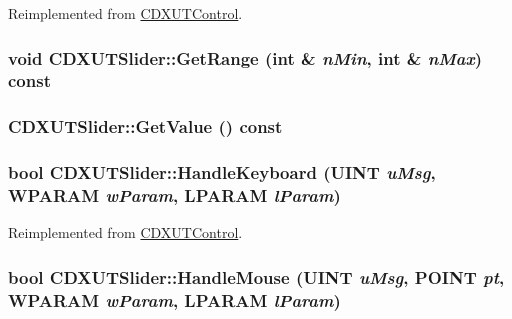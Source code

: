 Reimplemented from \hyperlink{class_c_d_x_u_t_control_a9b4410bbd1cac9a0ffce760aaa9a2d48}{CDXUTControl}.\hypertarget{class_c_d_x_u_t_slider_a84b28fcfeb72033f7ad4df3b505e62e5}{
\subsubsection[{GetRange}]{\setlength{\rightskip}{0pt plus 5cm}void CDXUTSlider::GetRange ({\bf int} \& {\em nMin}, \/  {\bf int} \& {\em nMax}) const}}
\label{class_c_d_x_u_t_slider_a84b28fcfeb72033f7ad4df3b505e62e5}
\hypertarget{class_c_d_x_u_t_slider_a74bf427b42c992666beddd456fe812e6}{
\subsubsection[{GetValue}]{ CDXUTSlider::GetValue () const}}
\label{class_c_d_x_u_t_slider_a74bf427b42c992666beddd456fe812e6}
\hypertarget{class_c_d_x_u_t_slider_a964f84282a049232a0620eaa58242fd2}{
\subsubsection[{HandleKeyboard}]{\setlength{\rightskip}{0pt plus 5cm}bool CDXUTSlider::HandleKeyboard (UINT {\em uMsg}, \/  WPARAM {\em wParam}, \/  LPARAM {\em lParam})}}
\label{class_c_d_x_u_t_slider_a964f84282a049232a0620eaa58242fd2}


Reimplemented from \hyperlink{class_c_d_x_u_t_control_a94044e608adeac7c329d83cf63587dcf}{CDXUTControl}.\hypertarget{class_c_d_x_u_t_slider_a20c8e1a621cc1a18f0535f5fd4bbd273}{
\subsubsection[{HandleMouse}]{\setlength{\rightskip}{0pt plus 5cm}bool CDXUTSlider::HandleMouse (UINT {\em uMsg}, \/  POINT {\em pt}, \/  WPARAM {\em wParam}, \/  LPARAM {\em lParam})}}
\label{class_c_d_x_u_t_slider_a20c8e1a621cc1a18f0535f5fd4bbd273}


